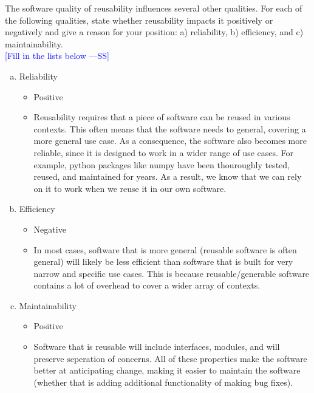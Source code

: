 \documentclass[12pt,fleqn]{examtst}
\newcommand{\authornote}[3]{\textcolor{#1}{[#3 ---#2]}}
\newcommand{\authornote}[3]{}
\newcommand{\wss}[1]{\authornote{blue}{SS}{#1}}
\begin{document}
\newpage


The software quality of reusability influences several other qualities.  For
each of the following qualities, state whether reusability impacts it positively
or negatively and give a reason for your position: a) reliability, b)
efficiency, and c) maintainability.\\

\noindent \wss{Fill in the lists below}

\begin{enumerate}[a)]
\item Reliability
\begin{itemize}
\item Positive
\item Reusability requires that a piece of software can be reused in various
contexts. This often means that the software needs to general, covering a more
general use case. As a consequence, the software also becomes more
reliable, since it is designed to work in a wider range of use cases.
For example, python packages like numpy have been thouroughly tested, reused,
and maintained for years. As a result, we know that we can rely on it to work
when we reuse it in our own software.
\end{itemize}
\item Efficiency
\begin{itemize}
\item Negative
\item In most cases, software that is more general (reusable software is often
general) will likely be less efficient than software that is built for very
narrow and specific use cases. This is because reusable/generable software
contains a lot of overhead to cover a wider array of contexts.
\end{itemize}
\item Maintainability
\begin{itemize}
\item Positive
\item Software that is reusable will include interfaces, modules, and will
preserve seperation of concerns. All of these properties make the software
better at anticipating change, making it easier to maintain the software
(whether that is adding additional functionality of making bug fixes).

\end{itemize}
\end{enumerate}
\end{document}
